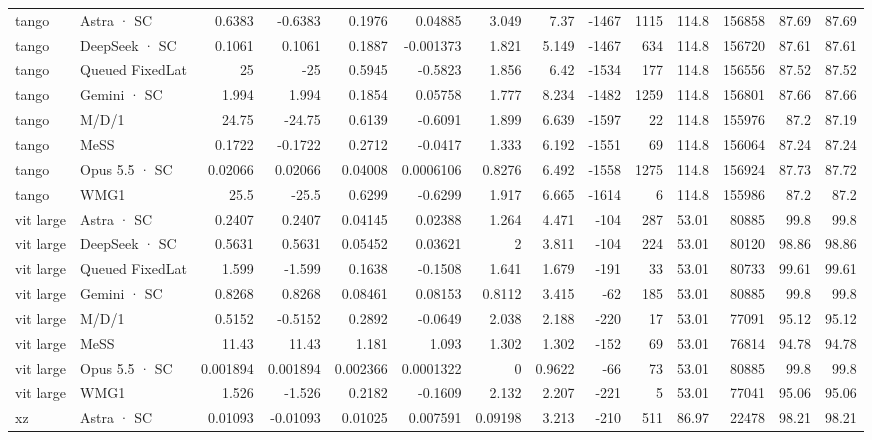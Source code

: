 \begin{tabular}{llrrrrrrrrrrrr}
tango & Astra · SC & 0.6383 & -0.6383 & 0.1976 & 0.04885 & 3.049 & 7.37 & -1467 & 1115 & 114.8 & 156858 & 87.69 & 87.69 \\
tango & DeepSeek · SC & 0.1061 & 0.1061 & 0.1887 & -0.001373 & 1.821 & 5.149 & -1467 & 634 & 114.8 & 156720 & 87.61 & 87.61 \\
tango & Queued FixedLat & 25 & -25 & 0.5945 & -0.5823 & 1.856 & 6.42 & -1534 & 177 & 114.8 & 156556 & 87.52 & 87.52 \\
tango & Gemini · SC & 1.994 & 1.994 & 0.1854 & 0.05758 & 1.777 & 8.234 & -1482 & 1259 & 114.8 & 156801 & 87.66 & 87.66 \\
tango & M/D/1 & 24.75 & -24.75 & 0.6139 & -0.6091 & 1.899 & 6.639 & -1597 & 22 & 114.8 & 155976 & 87.2 & 87.19 \\
tango & MeSS & 0.1722 & -0.1722 & 0.2712 & -0.0417 & 1.333 & 6.192 & -1551 & 69 & 114.8 & 156064 & 87.24 & 87.24 \\
tango & Opus 5.5 · SC & 0.02066 & 0.02066 & 0.04008 & 0.0006106 & 0.8276 & 6.492 & -1558 & 1275 & 114.8 & 156924 & 87.73 & 87.72 \\
tango & WMG1 & 25.5 & -25.5 & 0.6299 & -0.6299 & 1.917 & 6.665 & -1614 & 6 & 114.8 & 155986 & 87.2 & 87.2 \\
vit large & Astra · SC & 0.2407 & 0.2407 & 0.04145 & 0.02388 & 1.264 & 4.471 & -104 & 287 & 53.01 & 80885 & 99.8 & 99.8 \\
vit large & DeepSeek · SC & 0.5631 & 0.5631 & 0.05452 & 0.03621 & 2 & 3.811 & -104 & 224 & 53.01 & 80120 & 98.86 & 98.86 \\
vit large & Queued FixedLat & 1.599 & -1.599 & 0.1638 & -0.1508 & 1.641 & 1.679 & -191 & 33 & 53.01 & 80733 & 99.61 & 99.61 \\
vit large & Gemini · SC & 0.8268 & 0.8268 & 0.08461 & 0.08153 & 0.8112 & 3.415 & -62 & 185 & 53.01 & 80885 & 99.8 & 99.8 \\
vit large & M/D/1 & 0.5152 & -0.5152 & 0.2892 & -0.0649 & 2.038 & 2.188 & -220 & 17 & 53.01 & 77091 & 95.12 & 95.12 \\
vit large & MeSS & 11.43 & 11.43 & 1.181 & 1.093 & 1.302 & 1.302 & -152 & 69 & 53.01 & 76814 & 94.78 & 94.78 \\
vit large & Opus 5.5 · SC & 0.001894 & 0.001894 & 0.002366 & 0.0001322 & 0 & 0.9622 & -66 & 73 & 53.01 & 80885 & 99.8 & 99.8 \\
vit large & WMG1 & 1.526 & -1.526 & 0.2182 & -0.1609 & 2.132 & 2.207 & -221 & 5 & 53.01 & 77041 & 95.06 & 95.06 \\
xz & Astra · SC & 0.01093 & -0.01093 & 0.01025 & 0.007591 & 0.09198 & 3.213 & -210 & 511 & 86.97 & 22478 & 98.21 & 98.21 \\

\end{tabular}
